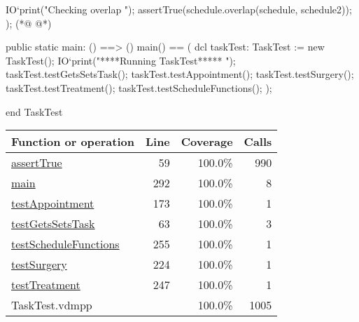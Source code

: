\begin{vdmpp}[breaklines=true]
   IO`print("\n Checking overlap \n");
   assertTrue(schedule.overlap(schedule, schedule2));
  );
(*@
\label{main:292}
@*)
  
  public static main: () ==> ()
   main() == (
    dcl taskTest: TaskTest := new TaskTest();
    IO`print("\n\n *****Running TaskTest***** \n");
    taskTest.testGetsSetsTask();
    taskTest.testAppointment();
    taskTest.testSurgery();
    taskTest.testTreatment();
    taskTest.testScheduleFunctions();
   );

end TaskTest
\end{vdmpp}
\bigskip
\begin{longtable}{|l|r|r|r|}
\hline
Function or operation & Line & Coverage & Calls \\
\hline
\hline
\hyperref[assertTrue:59]{assertTrue} & 59&100.0\% & 990 \\
\hline
\hyperref[main:292]{main} & 292&100.0\% & 8 \\
\hline
\hyperref[testAppointment:173]{testAppointment} & 173&100.0\% & 1 \\
\hline
\hyperref[testGetsSetsTask:63]{testGetsSetsTask} & 63&100.0\% & 3 \\
\hline
\hyperref[testScheduleFunctions:255]{testScheduleFunctions} & 255&100.0\% & 1 \\
\hline
\hyperref[testSurgery:224]{testSurgery} & 224&100.0\% & 1 \\
\hline
\hyperref[testTreatment:247]{testTreatment} & 247&100.0\% & 1 \\
\hline
\hline
TaskTest.vdmpp & & 100.0\% & 1005 \\
\hline
\end{longtable}

